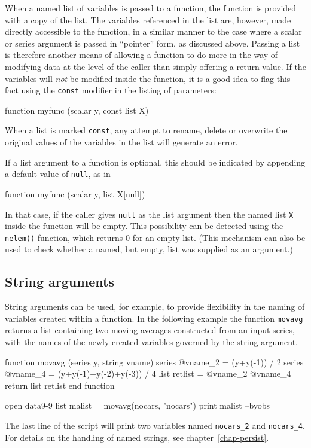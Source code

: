 When a named list of variables is passed to a function, the function
is provided with a copy of the list.  The variables referenced in the
list are, however, made directly accessible to the function, in a
similar manner to the case where a scalar or series argument is passed
in ``pointer'' form, as discussed above.  Passing a list is therefore
another means of allowing a function to do more in the way of
modifying data at the level of the caller than simply offering a
return value.  If the variables will \textit{not} be modified inside
the function, it is a good idea to flag this fact using the
\texttt{const} modifier in the listing of parameters:
%
\begin{code}
function myfunc (scalar y, const list X)
\end{code}
%
When a list is marked \texttt{const}, any attempt to rename, delete
or overwrite the original values of the variables in the list will
generate an error.

If a list argument to a function is optional, this should be indicated
by appending a default value of \texttt{null}, as in
%
\begin{code}
function myfunc (scalar y, list X[null])
\end{code}
%
In that case, if the caller gives \texttt{null} as the list argument
then the named list \texttt{X} inside the function will be empty.
This possibility can be detected using the \texttt{nelem()} function,
which returns 0 for an empty list.  (This mechanism can also be used
to check whether a named, but empty, list was supplied as an
argument.)

\subsection{String arguments}

String arguments can be used, for example, to provide flexibility in
the naming of variables created within a function.  In the following
example the function \texttt{movavg} returns a list containing two
moving averages constructed from an input series, with the names of
the newly created variables governed by the string argument.
%
\begin{code}
function movavg (series y, string vname)
   series @vname_2 = (y+y(-1)) / 2
   series @vname_4 = (y+y(-1)+y(-2)+y(-3)) / 4
   list retlist = @vname_2 @vname_4
   return list retlist
end function

open data9-9
list malist = movavg(nocars, "nocars")
print malist --byobs
\end{code}
%
The last line of the script will print two variables named
\verb|nocars_2| and \verb|nocars_4|.  For details on the handling of
named strings, see chapter~\ref{chap-persist}.


